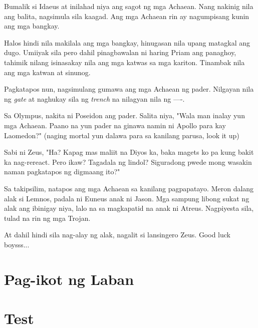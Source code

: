 \documentclass[12pt,letterpaper]{report}
\begin{document}
Bumalik si Idaeus at inilahad niya ang sagot ng mga Achaean. Nang nakinig nila ang balita, nagsimula sila kaagad. Ang mga Achaean rin ay nagumpisang kunin ang mga bangkay.

Halos hindi nila makilala ang mga bangkay, hinugasan nila upang matagkal ang dugo. Umiiyak sila pero dahil pinagbawalan ni haring Priam ang panaghoy, tahimik nilang isinasakay nila ang mga katwas sa mga kariton. Tinambak nila ang mga katwan at sinunog.

Pagkatapos nun, nagsimulang gumawa ang mga Achaean ng pader. Nilgayan nila ng \textit{gate} at naghukay sila ng \textit{trench} na nilagyan nila ng ----.

Sa Olympus, nakita ni Poseidon ang pader. Salita niya, "Wala man inalay yun mga Achaean. Paano na yun pader na ginawa namin ni Apollo para kay Laomedon?" (naging mortal yun dalawa para sa kanilang parusa, look it up)

Sabi ni Zeus, "Ha? Kapag mas maliit na Diyos ka, baka magets ko pa kung bakit ka nag-rereact. Pero ikaw? Tagadala ng lindol? Siguradong pwede mong wasakin naman pagkatapos ng digmaang ito?"

Sa takipsilim, natapos ang mga Achaean sa kanilang pagpapatayo. Meron dalang alak si Lemnos, padala ni Euneus anak ni Jason. Mga sampung libong sukat ng alak ang ibinigay niya, lalo na sa magkapatid na anak ni Atreus. Nagpiyesta sila, tulad na rin ng mga Trojan.

At dahil hindi sila nag-alay ng alak, nagalit si lansingero Zeus. Good luck boysss...
\pagebreak
\chapter{Pag-ikot ng Laban}
\pagebreak
\chapter{Test}
\end{document}
